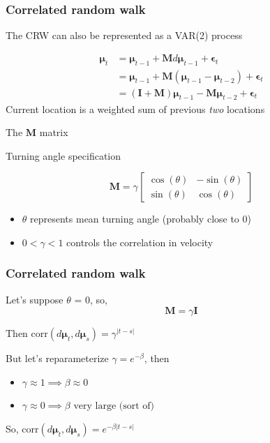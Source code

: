 \documentclass[36pt,handout]{beamer}
\newcommand{\ft}[1]{\frametitle{#1}}
\newcommand{\bmu}{\boldsymbol{\mu}}
\newcommand{\be}{\boldsymbol{\epsilon}}
\begin{document}

\begin{frame}
\ft{Correlated random walk}

The CRW can also be represented as a VAR(2) process

$$
\begin{aligned}
\bmu_t &= \bmu_{t-1} + \mathbf{M}d\bmu_{t-1} + \be_t \\ 
&= \bmu_{t-1} + \mathbf{M}(\bmu_{t-1}-\bmu_{t-2}) + \be_t \\ 
&= (\mathbf{I}+\mathbf{M})\bmu_{t-1} - \mathbf{M}\bmu_{t-2} + \be_t
\end{aligned}
$$
Current location is a weighted sum of previous {\em two} locations
\medskip

\textcolor{noaaturq}{\large The $\mathbf{M}$ matrix}

Turning angle specification

$$
\mathbf{M} = \gamma\left[\begin{array}{cc} \cos(\theta) & -\sin(\theta) \\ \sin(\theta) & \cos(\theta) \end{array} \right]
$$
\begin{itemize}
\item $\theta$ represents mean turning angle (probably close to 0) 
\item $0 < \gamma < 1$  controls the correlation in velocity
\end{itemize}

\end{frame}



\begin{frame}
\ft{Correlated random walk}
Let's suppose $\theta$ = 0, so,
$$\mathbf{M} = \gamma \mathbf{I}$$
\medskip

Then $\mbox{corr}(d\bmu_t, d\bmu_s) = \gamma^{|t-s|}$
\bigskip

But let's reparameterize $\gamma = e^{-\beta}$, then 
\begin{itemize}
\item $\gamma \approx 1 \implies \beta \approx 0$ 
\item $\gamma \approx 0 \implies \beta \mbox{ very large (sort of)}$ 
\end{itemize}

So, $\mbox{corr}(d\bmu_t, d\bmu_s) = e^{-\beta|t-s|}$

\end{frame}
\end{document}
